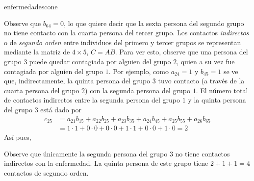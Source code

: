 \begin{examplebox}{}{enfermedadescone}
\begin{matrizn}
    \end{matrizn}
    Observe que $b_{64} = 0$, lo que quiere decir que la sexta persona del segundo grupo no tiene contacto con la cuarta persona del tercer grupo. Los contactos \textit{indirectos} o de \textit{segundo orden} entre individuos del primero y tercer grupos se representan mediante la matriz de $4 \times 5$, $C = AB$. Para ver esto, observe que una persona del grupo $3$ puede quedar contagiada por alguien del grupo $2$, quien a su vez fue contagiada por alguien del grupo $1$. Por ejemplo, como $a_{24} = 1$ y $b_{45} = 1$ se ve que, indirectamente, la quinta persona del grupo $3$ tuvo contacto (a través de la cuarta persona del grupo $2$) con la segunda persona del grupo $1$. El número total de contactos indirectos entre la segunda persona del grupo $1$ y la quinta persona del grupo $3$ está dado por
    \begin{align*}
        c_{25} & = a_{21}b_{15} + a_{22}b_{25} + a_{23}b_{35} + a_{24}b_{45} + a_{25}b_{55} + a_{26}b_{65} \\
        & = 1 \cdot 1 + 0 \cdot 0 + 0 \cdot 0 + 1 \cdot 1 + 0 \cdot 0 + 1 \cdot 0 = 2
    \end{align*}
    Así pues,
    \begin{matrizn}
    \end{matrizn}
    Observe que únicamente la segunda persona del grupo $3$ no tiene contactos indirectos con la enfermedad. La quinta persona de este grupo tiene $2 + 1 + 1 = 4$ contactos de segundo orden.
\end{examplebox}

\newpage

